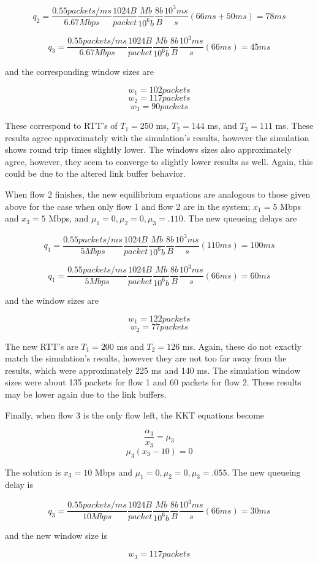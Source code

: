 $$q_2 = \frac{0.55 packets/ms}{6.67 Mbps} \frac{1024 B}{packet} \frac{Mb}{10^6 b} \frac{8 b}{B} \frac{10^3 ms}{s} (66 ms + 50 ms) = 78 ms$$

$$q_3 = \frac{0.55 packets/ms}{6.67 Mbps} \frac{1024 B}{packet} \frac{Mb}{10^6 b} \frac{8 b}{B} \frac{10^3 ms}{s} (66 ms) = 45 ms$$

and the corresponding window sizes are

$$w_1 = 102 packets$$
$$w_2 = 117 packets$$
$$w_3 = 90 packets $$

These correspond to RTT's of $T_1 = 250$ ms, $T_2 = 144$ ms, and $T_3 = 111$ ms. These results agree approximately with the simulation's results, however the simulation shows round trip times slightly lower. The windows sizes also approximately agree, however, they seem to converge to slightly lower results as well. Again, this could be due to the altered link buffer behavior.

When flow 2 finishes, the new equilibrium equations are analogous to those given above for the case when only flow 1 and flow 2 are in the system; $x_1 = 5$ Mbps and $x_3 = 5$ Mbps, and $\mu_1 = 0, \mu_2 = 0, \mu_3 = .110$. The new queueing delays are 

$$q_1 = \frac{0.55 packets/ms}{5 Mbps} \frac{1024 B}{packet} \frac{Mb}{10^6 b} \frac{8 b}{B} \frac{10^3 ms}{s} (110 ms) = 100 ms$$

$$q_1 = \frac{0.55 packets/ms}{5 Mbps} \frac{1024 B}{packet} \frac{Mb}{10^6 b} \frac{8 b}{B} \frac{10^3 ms}{s} (66 ms) = 60 ms$$

and the window sizes are

$$w_1 = 122 packets$$
$$w_2 = 77 packets$$

The new RTT's are $T_1 = 200$ ms and $T_2 = 126$ ms. Again, these do not exactly match the simulation's results, however they are not too far away from the results, which were approximately 225 ms and 140 ms. The simulation window sizes were about 135 packets for flow 1 and 60 packets for flow 2. These results may be lower again due to the link buffers.

Finally, when flow 3 is the only flow left, the KKT equations become

$$\frac{\alpha_3}{x_3}=\mu_3$$
$$\mu_3 (x_3 - 10) = 0$$

The solution is $x_3 = 10$ Mbps and $\mu_1 = 0, \mu_2 = 0, \mu_3 = .055$. The new queueing delay is 

$$q_3 = \frac{0.55 packets/ms}{10 Mbps} \frac{1024 B}{packet} \frac{Mb}{10^6 b} \frac{8 b}{B}  \frac{10^3 ms}{s} (66 ms) = 30 ms$$

and the new window size is

$$w_3 = 117 packets$$

